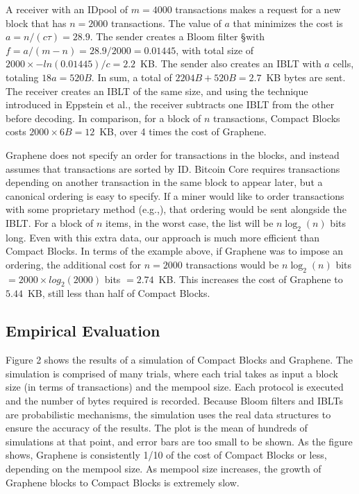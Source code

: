  A receiver with an IDpool of $m=4000$ transactions
makes a request for a new block that has $n=2000$ transactions. The
value of $a$ that minimizes the cost is $a=n/(c\tau)=28.9$. The sender
creates a Bloom filter \S with $f=a/(m-n)=28.9/2000= 0.01445$,
with total size of $2000\times -ln(0.01445)/c=2.2$~KB.  The
sender also creates an IBLT with $a$ cells, totaling $18a=520B$. In
sum, a total of $2204B+520B=2.7$~KB bytes are sent.  The receiver
creates an IBLT of the same size, and using the technique introduced
in Eppstein et al.\cite{eppstein:2011}, the receiver subtracts one
IBLT from the other before decoding. In comparison, for a block of $n$ transactions, Compact Blocks costs $2000\times6B = 12$~KB, over 4 times the cost of Graphene. 

 Graphene does not specify an order for transactions
in the blocks, and instead assumes that transactions are sorted by
ID. Bitcoin Core requires transactions depending on another transaction in
the same block to appear later, but a canonical ordering is easy to
specify. If a miner would like to order transactions with some
proprietary method (e.g.,\cite{Hanke:2016}), that ordering would be
sent alongside the IBLT. For a block of $n$ items, in the worst case,
the list will be $n\log_2(n)$ bits long.  Even with this extra data, our approach is much more efficient than Compact Blocks.   In terms of the example above, if Graphene was to impose an ordering, the additional cost for $n=2000$ transactions would be $n \log_2(n)$ bits $= 2000\times log_2(2000)$ bits $= 2.74$~KB. This increases the cost of Graphene to $5.44$~KB, still less than half of Compact Blocks.



\subsection{Empirical Evaluation}

Figure 2 shows the results of a simulation of
Compact Blocks and Graphene. The simulation is comprised
of many trials, where each trial takes as input a block size (in terms
of transactions) and the mempool size. Each protocol is executed and the
number of bytes required is recorded. Because Bloom filters
and IBLTs are probabilistic mechanisms, the simulation uses
the real data structures to ensure the accuracy of the results.
The plot is the mean of hundreds of simulations
at that point, and error bars are too small to be shown.
As the figure shows, Graphene is consistently 1/10 of the
cost of Compact Blocks or less, depending on the mempool
size. As mempool size increases, the growth of Graphene blocks to Compact Blocks is extremely slow.

